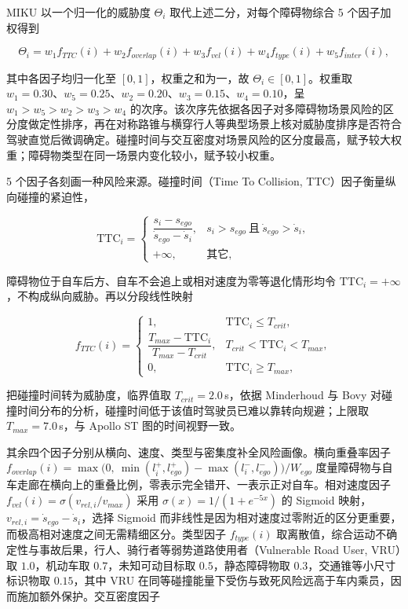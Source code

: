 \documentclass[a4paper,11pt]{ctexart}
\theoremstyle{definition}
\begin{document}
MIKU 以一个归一化的威胁度 $\Theta_i$ 取代上述二分，对每个障碍物综合 5 个因子加权得到

\begin{equation}
    \Theta_i = w_1 f_{TTC}(i) + w_2 f_{overlap}(i) + w_3 f_{vel}(i) + w_4 f_{type}(i) + w_5 f_{inter}(i),
    \label{eq:threat_score}
\end{equation}

其中各因子均归一化至 $[0,1]$，权重之和为一，故 $\Theta_i \in [0,1]$。权重取 $w_1=0.30$、$w_5=0.25$、$w_2=0.20$、$w_3=0.15$、$w_4=0.10$，呈 $w_1>w_5>w_2>w_3>w_4$ 的次序。该次序先依据各因子对多障碍物场景风险的区分度做定性排序，再在对称路锥与横穿行人等典型场景上核对威胁度排序是否符合驾驶直觉后微调确定。碰撞时间与交互密度对场景风险的区分度最高，赋予较大权重；障碍物类型在同一场景内变化较小，赋予较小权重。

5 个因子各刻画一种风险来源。碰撞时间（Time To Collision, TTC）因子衡量纵向碰撞的紧迫性，

\begin{equation}
    \mathrm{TTC}_i =
    \begin{cases}
        \dfrac{s_i - s_{ego}}{\dot{s}_{ego} - \dot{s}_i}, & s_i > s_{ego} \ \text{且}\ \dot{s}_{ego} > \dot{s}_i, \\[0.6em]
        +\infty, & \text{其它},
    \end{cases}
    \label{eq:ttc}
\end{equation}

障碍物位于自车后方、自车不会追上或相对速度为零等退化情形均令 $\mathrm{TTC}_i=+\infty$，不构成纵向威胁。再以分段线性映射

\begin{equation}
    f_{TTC}(i) =
    \begin{cases}
        1, & \mathrm{TTC}_i \leq T_{crit}, \\[0.3em]
        \dfrac{T_{max} - \mathrm{TTC}_i}{T_{max} - T_{crit}}, & T_{crit} < \mathrm{TTC}_i < T_{max}, \\[0.6em]
        0, & \mathrm{TTC}_i \geq T_{max},
    \end{cases}
    \label{eq:f_ttc}
\end{equation}

把碰撞时间转为威胁度，临界值取 $T_{crit}=2.0$\,s，依据 Minderhoud 与 Bovy 对碰撞时间分布的分析，碰撞时间低于该值时驾驶员已难以靠转向规避；上限取 $T_{max}=7.0$\,s，与 Apollo ST 图的时间视野一致。

其余四个因子分别从横向、速度、类型与密集度补全风险画像。横向重叠率因子 $f_{overlap}(i)=\max\!\big(0,\ \min(l_i^{+}, l_{ego}^{+}) - \max(l_i^{-}, l_{ego}^{-})\big)/W_{ego}$ 度量障碍物与自车走廊在横向上的重叠比例，零表示完全错开、一表示正对自车。相对速度因子 $f_{vel}(i)=\sigma(v_{rel,i}/v_{max})$ 采用 $\sigma(x)=1/(1+e^{-5x})$ 的 Sigmoid 映射，$v_{rel,i}=\dot{s}_{ego}-\dot{s}_i$，选择 Sigmoid 而非线性是因为相对速度过零附近的区分更重要，而极高相对速度之间无需精细区分。类型因子 $f_{type}(i)$ 取离散值，综合运动不确定性与事故后果，行人、骑行者等弱势道路使用者（Vulnerable Road User, VRU）取 $1.0$，机动车取 $0.7$，未知可动目标取 $0.5$，静态障碍物取 $0.3$，交通锥等小尺寸标识物取 $0.15$，其中 VRU 在同等碰撞能量下受伤与致死风险远高于车内乘员，因而施加额外保护。交互密度因子
\end{document}
